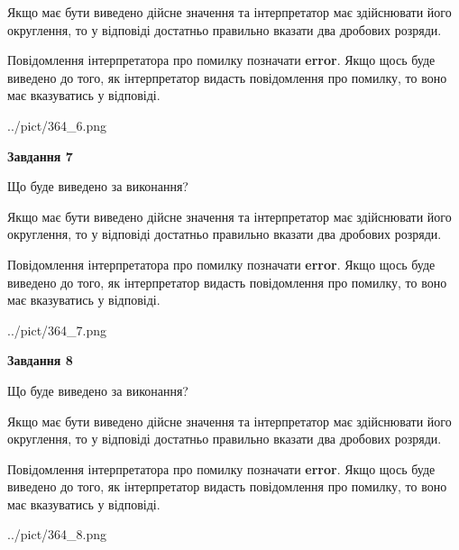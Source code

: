 \documentclass[12pt, ukrainian]{article}
\begin{document}
{\begin {Large}
Якщо має бути виведено дійсне значення та інтерпретатор має здійснювати його округлення, 
то у відповіді достатньо правильно вказати два дробових розряди.

Повідомлення інтерпретатора про помилку позначати \textbf{error}.
Якщо щось буде виведено до того, як інтерпретатор видасть повідомлення про помилку, 
то воно має вказуватись у відповіді. \par

\begin{center}
	{../pict/364_6.png}
\end{center}
\newpage

{\begin {center}\textbf{Завдання 7}\end {center}}\par
Що буде виведено за виконання? \par

Якщо має бути виведено дійсне значення та інтерпретатор має здійснювати його округлення, 
то у відповіді достатньо правильно вказати два дробових розряди.

Повідомлення інтерпретатора про помилку позначати \textbf{error}.
Якщо щось буде виведено до того, як інтерпретатор видасть повідомлення про помилку, 
то воно має вказуватись у відповіді. \par

\begin{center}
	{../pict/364_7.png}
\end{center}
\newpage

{\begin {center}\textbf{Завдання 8}\end {center}}\par
Що буде виведено за виконання? \par

Якщо має бути виведено дійсне значення та інтерпретатор має здійснювати його округлення, 
то у відповіді достатньо правильно вказати два дробових розряди.

Повідомлення інтерпретатора про помилку позначати \textbf{error}.
Якщо щось буде виведено до того, як інтерпретатор видасть повідомлення про помилку, 
то воно має вказуватись у відповіді. \par

\begin{center}
	{../pict/364_8.png}
\end{center}
\newpage


\end{Large}}
\end{document}
